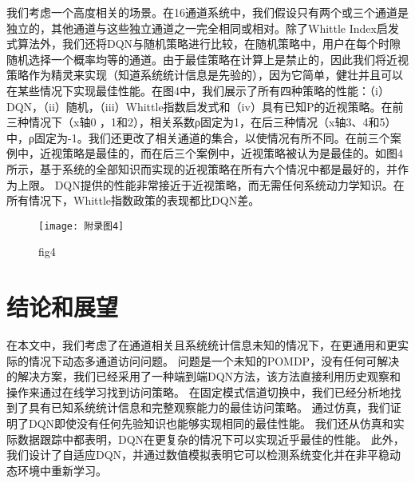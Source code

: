 我们考虑一个高度相关的场景。在16通道系统中，我们假设只有两个或三个通道是独立的，其他通道与这些独立通道之一完全相同或相对。除了Whittle Index启发式算法外，我们还将DQN与随机策略进行比较，在随机策略中，用户在每个时隙随机选择一个概率均等的通道。由于最佳策略在计算上是禁止的，因此我们将近视策略作为精灵来实现（知道系统统计信息是先验的），因为它简单，健壮并且可以在某些情况下实现最佳性能。在图4中，我们展示了所有四种策略的性能：（i）DQN，（ii）随机，（iii）Whittle指数启发式和（iv）具有已知P的近视策略。在前三种情况下（x轴0 ，1和2），相关系数ρ固定为1，在后三种情况（x轴3、4和5）中，ρ固定为-1。我们还更改了相关通道的集合，以使情况有所不同。在前三个案例中，近视策略是最佳的，而在后三个案例中，近视策略被认为是最佳的。如图4所示，基于系统的全部知识而实现的近视策略在所有六个情况中都是最好的，并作为上限。 DQN提供的性能非常接近于近视策略，而无需任何系统动力学知识。在所有情况下，Whittle指数政策的表现都比DQN差。
\begin{figure}[h]
	\centering
	\texttt{[image: 附录图4]}
	\caption{fig4}
\end{figure}
\section*{  结论和展望   }

在本文中，我们考虑了在通道相关且系统统计信息未知的情况下，在更通用和更实际的情况下动态多通道访问问题。 问题是一个未知的POMDP，没有任何可解决的解决方案，我们已经采用了一种端到端DQN方法，该方法直接利用历史观察和操作来通过在线学习找到访问策略。 在固定模式信道切换中，我们已经分析地找到了具有已知系统统计信息和完整观察能力的最佳访问策略。 通过仿真，我们证明了DQN即使没有任何先验知识也能够实现相同的最佳性能。 我们还从仿真和实际数据跟踪中都表明，DQN在更复杂的情况下可以实现近乎最佳的性能。 此外，我们设计了自适应DQN，并通过数值模拟表明它可以检测系统变化并在非平稳动态环境中重新学习。

